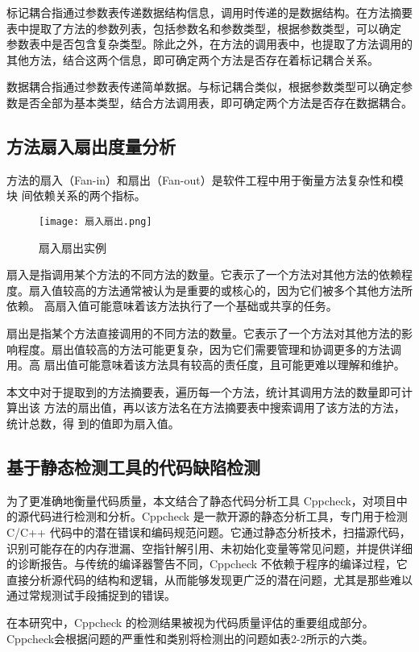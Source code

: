 标记耦合指通过参数表传递数据结构信息，调用时传递的是数据结构。在方法摘要
表中提取了方法的参数列表，包括参数名和参数类型，根据参数类型，可以确定
参数表中是否包含复杂类型。除此之外，在方法的调用表中，也提取了方法调用的
其他方法，结合这两个信息，即可确定两个方法是否存在着标记耦合关系。


数据耦合指通过参数表传递简单数据。与标记耦合类似，根据参数类型可以确定参
数是否全部为基本类型，结合方法调用表，即可确定两个方法是否存在数据耦合。
\subsection{方法扇入扇出度量分析}

方法的扇入（Fan-in）和扇出（Fan-out）是软件工程中用于衡量方法复杂性和模块
间依赖关系的两个指标。

\begin{figure}[h]
\centering
\texttt{[image: 扇入扇出.png]}
\caption{扇入扇出实例}
\end{figure}
    

扇入是指调用某个方法的不同方法的数量。它表示了一个方法对其他方法的依赖程
度。扇入值较高的方法通常被认为是重要的或核心的，因为它们被多个其他方法所依赖。
高扇入值可能意味着该方法执行了一个基础或共享的任务。


扇出是指某个方法直接调用的不同方法的数量。它表示了一个方法对其他方法的影
响程度。扇出值较高的方法可能更复杂，因为它们需要管理和协调更多的方法调用。高
扇出值可能意味着该方法具有较高的责任度，且可能更难以理解和维护。


本文中对于提取到的方法摘要表，遍历每一个方法，统计其调用方法的数量即可计算出该
方法的扇出值，再以该方法名在方法摘要表中搜索调用了该方法的方法，统计总数，得
到的值即为扇入值。

\subsection{基于静态检测工具的代码缺陷检测}

为了更准确地衡量代码质量，本文结合了静态代码分析工具 Cppcheck，对项目中的源代码进行检测和分析。Cppcheck 是一款开源的静态分析工具，专门用于检测 C/C++ 代码中的潜在错误和编码规范问题。它通过静态分析技术，扫描源代码，识别可能存在的内存泄漏、空指针解引用、未初始化变量等常见问题，并提供详细的诊断报告。与传统的编译器警告不同，Cppcheck 不依赖于程序的编译过程，它直接分析源代码的结构和逻辑，从而能够发现更广泛的潜在问题，尤其是那些难以通过常规测试手段捕捉到的错误。

在本研究中，Cppcheck 的检测结果被视为代码质量评估的重要组成部分。Cppcheck会根据问题的严重性和类别将检测出的问题如表2-2所示的六类。

